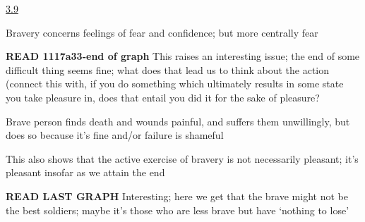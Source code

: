 \documentclass[11pt]{article}
\begin{document}
\noindent\underline{3.9}
\vspace*{4mm}

\noindent Bravery concerns feelings of fear and confidence; but more centrally fear
\vspace*{2mm}

\noindent\textbf{READ 1117a33-end of graph} This raises an interesting issue; the end of some difficult thing seems fine; what does that lead us to think about the action (connect this with, if you do something which ultimately results in some state you take pleasure in, does that entail you did it for the sake of pleasure?
\vspace*{2mm}

\noindent Brave person finds death and wounds painful, and suffers them unwillingly, but does so because it's fine and/or failure is shameful
\vspace*{2mm}

\noindent This also shows that the active exercise of bravery is not necessarily pleasant; it's pleasant insofar as we attain the end
\vspace*{2mm}

\noindent\textbf{READ LAST GRAPH} Interesting; here we get that the brave might not be the best soldiers; maybe it's those who are less brave but have `nothing to lose'
\end{document}
